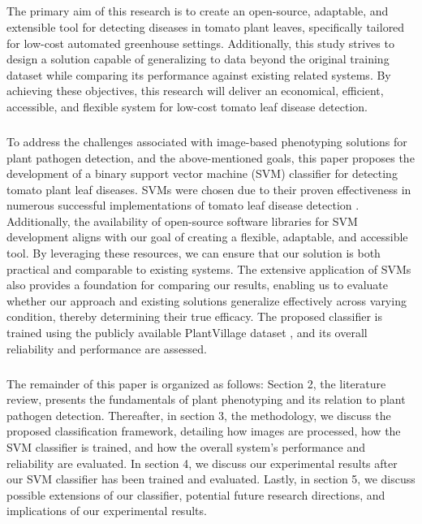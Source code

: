 \subparagraph{}
The primary aim of this research is to create an open-source, adaptable, and extensible tool for detecting diseases in tomato plant leaves, specifically tailored for low-cost automated greenhouse settings. Additionally, this study strives to design a solution capable of generalizing to data beyond the original training dataset while comparing its performance against existing related systems. By achieving these objectives, this research will deliver an economical, efficient, accessible, and flexible system for low-cost tomato leaf disease detection. 	
 
\subparagraph{}
To address the challenges associated with image-based phenotyping solutions for plant pathogen detection, and the above-mentioned goals, this paper proposes the development of a binary support vector machine (SVM) classifier \cite{vapnikNatureStatisticalLearning2000} for detecting tomato plant leaf diseases. SVMs were chosen due to their proven effectiveness in numerous successful implementations of tomato leaf disease detection \cite{khanAutomatedTomatoLeaf2024, terlapuIntelligentDetectionTomato2025, mokhtarSVMBasedDetectionTomato2015}. Additionally, the availability of open-source software libraries for SVM development aligns with our goal of creating a flexible, adaptable, and accessible tool. By leveraging these resources, we can ensure that our solution is both practical and comparable to existing systems. The extensive application of SVMs also provides a foundation for comparing our results, enabling us to evaluate whether our approach and existing solutions generalize effectively across varying condition, thereby determining their true efficacy. The proposed classifier is trained using the publicly available PlantVillage dataset \cite{hughesOpenAccessRepository2016}, and its overall reliability and performance are  assessed.

\subparagraph{}
The remainder of this paper is organized as follows: Section 2, the literature review, presents the fundamentals of plant phenotyping and its relation to plant pathogen detection. Thereafter, in section 3, the methodology, we discuss the proposed classification framework, detailing how images are processed, how the SVM classifier is trained, and how the overall system's performance and reliability are evaluated. In section 4, we discuss our experimental results after our SVM classifier has been trained and evaluated. Lastly, in section 5, we discuss possible extensions of our classifier, potential future research directions, and implications of our experimental results.